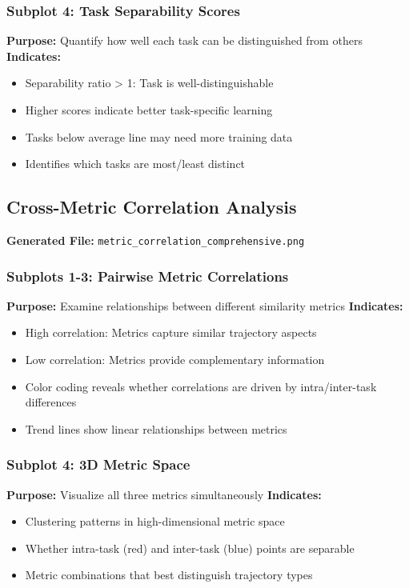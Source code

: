 \documentclass{article}
\begin{document}
\subsubsection{Subplot 4: Task Separability Scores}
\textbf{Purpose:} Quantify how well each task can be distinguished from others
\textbf{Indicates:}
\begin{itemize}
    \item Separability ratio > 1: Task is well-distinguishable
    \item Higher scores indicate better task-specific learning
    \item Tasks below average line may need more training data
    \item Identifies which tasks are most/least distinct
\end{itemize}

\subsection{Cross-Metric Correlation Analysis}

\textbf{Generated File:} \texttt{metric\_correlation\_comprehensive.png}

\subsubsection{Subplots 1-3: Pairwise Metric Correlations}
\textbf{Purpose:} Examine relationships between different similarity metrics
\textbf{Indicates:}
\begin{itemize}
    \item High correlation: Metrics capture similar trajectory aspects
    \item Low correlation: Metrics provide complementary information
    \item Color coding reveals whether correlations are driven by intra/inter-task differences
    \item Trend lines show linear relationships between metrics
\end{itemize}

\subsubsection{Subplot 4: 3D Metric Space}
\textbf{Purpose:} Visualize all three metrics simultaneously
\textbf{Indicates:}
\begin{itemize}
    \item Clustering patterns in high-dimensional metric space
    \item Whether intra-task (red) and inter-task (blue) points are separable
    \item Metric combinations that best distinguish trajectory types
\end{itemize}
\end{document}
